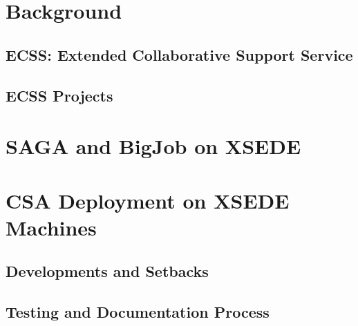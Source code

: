 \documentclass{sig-alternate}
\begin{document}
\section{Background}
\subsection{ECSS: Extended Collaborative Support Service }
\subsection{ECSS Projects}

\section{SAGA and BigJob on XSEDE}

\section{CSA Deployment on XSEDE Machines}


\subsection{Developments and Setbacks}

\subsection{Testing and Documentation Process}
\end{document}
